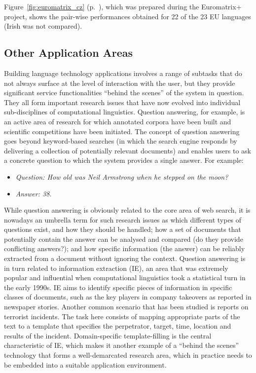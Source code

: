 \begin{multicols}{2}
Figure~\ref{fig:euromatrix_cz} (p.~\pageref{fig:euromatrix_cz}), which was prepared during the Euromatrix+ project, shows the pair-wise performances obtained for 22 of the 23 EU languages (Irish was not compared). %

\subsection{Other Application Areas}
Building language technology applications involves a range of subtasks that do not always surface at the level of interaction with the user, but they provide significant service functionalities “behind the scenes” of the system in question. They all form important research issues that have now evolved into individual sub-disciplines of computational linguistics. Question answering, for example, is an active area of research for which annotated corpora have been built and scientific competitions have been initiated. The concept of question answering goes beyond keyword-based searches (in which the search engine responds by delivering a collection of potentially relevant documents) and enables users to ask a concrete question to which the system provides a single answer. For example:

\begin{itemize}
\item[] \textit{Question: How old was Neil Armstrong when he stepped on the moon?}
\item[] \textit{Answer: 38.}
\end{itemize}

While question answering is obviously related to the core area of web search, it is nowadays an umbrella term for such research issues as which different types of questions exist, and how they should be handled; how a set of documents that potentially contain the answer can be analysed and compared (do they provide conflicting answers?); and how specific information (the answer) can be reliably extracted from a document without ignoring the context. Question answering is in turn related to information extraction (IE), an area that was extremely popular and influential when computational linguistics took a statistical turn in the early 1990s. IE aims to identify specific pieces of information in specific classes of documents, such as the key players in company takeovers as reported in newspaper stories. Another common scenario that has been studied is reports on terrorist incidents. The task here consists of mapping appropriate parts of the text to a template that specifies the perpetrator, target, time, location and results of the incident. Domain-specific template-filling is the central characteristic of IE, which makes it another example of a “behind the scenes” technology that forms a well-demarcated research area, which in practice needs to be embedded into a suitable application environment.


\end{multicols}
